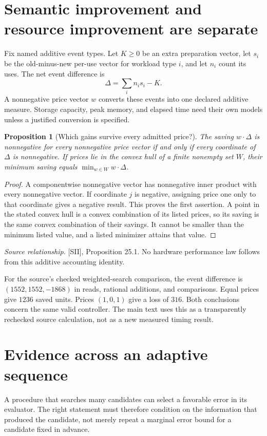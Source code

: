 \documentclass[11pt,oneside,openany]{book}
\newtheorem{proposition}[theorem]{Proposition}
\theoremstyle{definition}\newtheorem{definition}[theorem]{Definition}
\newcommand{\source}[1]{\par{\small\textit{Source relationship.} #1}\par}
\begin{document}
\section{Semantic improvement and resource improvement are separate}
Fix named additive event types. Let $K\ge0$ be an extra preparation vector, let $s_i$ be the old-minus-new per-use vector for workload type $i$, and let $n_i$ count its uses. The net event difference is
\[
\Delta=\sum_i n_i s_i-K.
\]
A nonnegative price vector $w$ converts these events into one declared additive measure. Storage capacity, peak memory, and elapsed time need their own models unless a justified conversion is specified.

\begin{proposition}[Which gains survive every admitted price?]\label{r:prices}
The saving $w\cdot\Delta$ is nonnegative for every nonnegative price vector if and only if every coordinate of $\Delta$ is nonnegative. If prices lie in the convex hull of a finite nonempty set $W$, their minimum saving equals $\min_{w\in W}w\cdot\Delta$.
\end{proposition}
\begin{proof}
A componentwise nonnegative vector has nonnegative inner product with every nonnegative vector. If coordinate $j$ is negative, assigning price one only to that coordinate gives a negative result. This proves the first assertion. A point in the stated convex hull is a convex combination of its listed prices, so its saving is the same convex combination of their savings. It cannot be smaller than the minimum listed value, and a listed minimizer attains that value.
\end{proof}
\source{[SII], Proposition 25.1. No hardware performance law follows from this additive accounting identity.}

For the source's checked weighted-search comparison, the event difference is $(1552,1552,-1868)$ in reads, rational additions, and comparisons. Equal prices give $1236$ saved units. Prices $(1,0,1)$ give a loss of $316$. Both conclusions concern the same valid controller. The main text uses this as a transparently rechecked source calculation, not as a new measured timing result.

\section{Evidence across an adaptive sequence}
A procedure that searches many candidates can select a favorable error in its evaluator. The right statement must therefore condition on the information that produced the candidate, not merely repeat a marginal error bound for a candidate fixed in advance.
\end{document}
